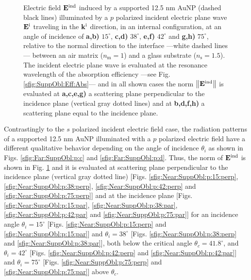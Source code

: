 \begin{figure}[!H]
{    Electric field $\vb{E}^\text{ind}$ induced by a supported 12.5 nm AuNP (dashed black lines) illuminated by a $p$ polarized incident electric plane wave $\vb{E}^\text{i}$ traveling in the $\vb{k}^\text{i}$ direction, in an internal configuration, at an angle of incidence of \textbf{a,b)} $15^\circ$, \textbf{c,d)} $38^\circ$, \textbf{e,f)} $42^\circ$ and \textbf{g,h)} $75^\circ$, relative to the normal direction to the interface ---white dashed lines--- between an air matrix ($n_\text{m} = 1$) and a glass substrate ($n_\text{s} = 1.5$). The incident electric plane wave is evaluated at the resonance wavelength of the absorption efficiency ---see Fig. \ref{sfig:SuppObl:Eff:Abs}--- and in all shown cases the norm $\norm{\vb{E}^\text{ind}}$ is evaluated at  \textbf{a,c,e,g)} a scattering plane perpendicular to the incidence plane (vertical gray dotted lines) and at \textbf{b,d,f,h)} a scattering plane equal to the incidence plane.
    }
    \label{fig:Near:SuppObl:p}
  \end{figure}

Contrastingly to the $s$ polarized incident electric field case, the radiation patterns of a supported 12.5 nm AuNP illuminated with a $p$ polarized electric field have a different qualitative behavior depending on the angle of incidence $\theta_i$ as shown in Figs. \ref{sfig:Far:SuppObl:p:c} and  \ref{sfig:Far:SuppObl:p:d}. Thus, the norm of $\vb{E}^\text{ind}$ is shown in Fig. \ref{fig:Near:SuppObl:p} and it is evaluated at scattering plane perpendicular to the incidence plane (vertical gray dotted line) [Figs. \ref{sfig:Near:SuppObl:p:15:perp}, \ref{sfig:Near:SuppObl:p:38:perp}, \ref{sfig:Near:SuppObl:p:42:perp} and \ref{sfig:Near:SuppObl:p:75:perp}] and at the incidence  plane [Figs. \ref{sfig:Near:SuppObl:p:15:par}, \ref{sfig:Near:SuppObl:p:38:par}, \ref{sfig:Near:SuppObl:p:42:par} and \ref{sfig:Near:SuppObl:p:75:par}] for an incidence angle $\theta_i = 15^\circ$ [Figs. \ref{sfig:Near:SuppObl:p:15:perp}  and \ref{sfig:Near:SuppObl:p:15:par}] and  $\theta_i = 38^\circ$ [Figs. \ref{sfig:Near:SuppObl:p:38:perp}  and \ref{sfig:Near:SuppObl:p:38:par}], both below the critical angle $\theta_c = 41.8^\circ$, and $\theta_i = 42^\circ$ [Figs. \ref{sfig:Near:SuppObl:p:42:perp}  and \ref{sfig:Near:SuppObl:p:42:par}] and  $\theta_i = 75^\circ$ [Figs. \ref{sfig:Near:SuppObl:p:75:perp}  and \ref{sfig:Near:SuppObl:p:75:par}] above $\theta_c$.

